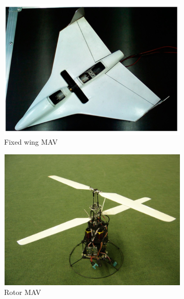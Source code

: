 \begin{figure}[H]
     \centering
     \begin{subfigure}[b]{0.3\textwidth}
         \centering
         \includegraphics[width=\textwidth]{01_Introduction/Figs/fixed.jpg}
         \caption{Fixed wing MAV \cite{Sibilski2020}}
     \end{subfigure}
     \hfill
     \begin{subfigure}[b]{0.3\textwidth}
         \centering
         \includegraphics[width=\textwidth]{01_Introduction/Figs/rotar.png}
         \caption{Rotor MAV \cite{rotar2022}}
     \end{subfigure}
     \hfill
     \begin{subfigure}[b]{0.3\textwidth}

\end{subfigure}
\end{figure}
